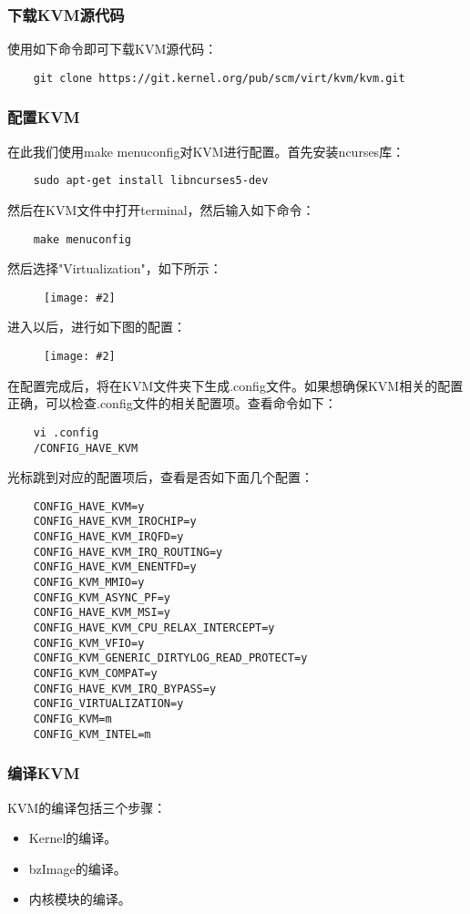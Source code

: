 \documentclass[a4paper,left=2.5cm,right=2.5cm,11pt]{article}
\newcommand{\sizedfic}[2]{\begin{figure}[H]
		\center
		\texttt{[image: \#2]}
	\end{figure}}
\begin{document}
\subsubsection{下载KVM源代码}
	使用如下命令即可下载KVM源代码：
	\begin{lstlisting}
	git clone https://git.kernel.org/pub/scm/virt/kvm/kvm.git
	\end{lstlisting}

\subsubsection{配置KVM}
	在此我们使用make menuconfig对KVM进行配置。首先安装ncurses库：
	\begin{lstlisting}
	sudo apt-get install libncurses5-dev
	\end{lstlisting}

	然后在KVM文件中打开terminal，然后输入如下命令：
	\begin{lstlisting}
	make menuconfig
	\end{lstlisting}

	然后选择"Virtualization"，如下所示：
	\sizedfic{0.7}{1.png}

	进入以后，进行如下图的配置：
	\sizedfic{0.7}{2.png}

	在配置完成后，将在KVM文件夹下生成.config文件。如果想确保KVM相关的配置正确，可以检查.config文件的相关配置项。查看命令如下：
	\begin{lstlisting}
	vi .config
	/CONFIG_HAVE_KVM
	\end{lstlisting}

	光标跳到对应的配置项后，查看是否如下面几个配置：
	\begin{lstlisting}
	CONFIG_HAVE_KVM=y
	CONFIG_HAVE_KVM_IROCHIP=y
	CONFIG_HAVE_KVM_IRQFD=y
	CONFIG_HAVE_KVM_IRQ_ROUTING=y
	CONFIG_HAVE_KVM_ENENTFD=y
	CONFIG_KVM_MMIO=y
	CONFIG_KVM_ASYNC_PF=y
	CONFIG_HAVE_KVM_MSI=y
	CONFIG_HAVE_KVM_CPU_RELAX_INTERCEPT=y
	CONFIG_KVM_VFIO=y
	CONFIG_KVM_GENERIC_DIRTYLOG_READ_PROTECT=y
	CONFIG_KVM_COMPAT=y
	CONFIG_HAVE_KVM_IRQ_BYPASS=y
	CONFIG_VIRTUALIZATION=y
	CONFIG_KVM=m
	CONFIG_KVM_INTEL=m
	\end{lstlisting}

\subsubsection{编译KVM}
	KVM的编译包括三个步骤：
	\begin{itemize}
		\item Kernel的编译。
		\item bzImage的编译。
		\item 内核模块的编译。
	\end{itemize}
\end{document}
